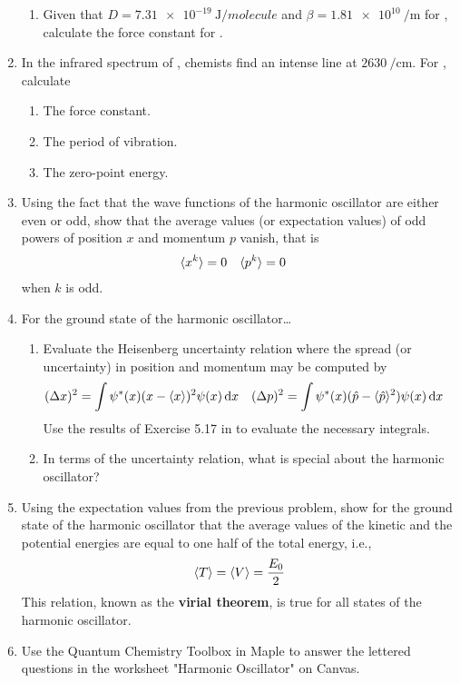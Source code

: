 \documentclass[../psets.tex]{subfiles}
\begin{document}
\begin{enumerate}
\begin{enumerate}
        \item Given that $D=\SI{7.31e-19}{\joule\per molecule}$ and $\beta=\SI{1.81e10}{\per\meter}$ for , calculate the force constant for .
    \end{enumerate}
    \item In the infrared spectrum of , chemists find an intense line at $\SI{2630}{\per\centi\meter}$. For , calculate
    \begin{enumerate}
        \item The force constant.
        \item The period of vibration.
        \item The zero-point energy.
    \end{enumerate}
    \item Using the fact that the wave functions of the harmonic oscillator are either even or odd, show that the average values (or expectation values) of odd powers of position $x$ and momentum $p$ vanish, that is
    \begin{align*}
        \langle{x^k}\rangle &= 0&
        \langle{p^k}\rangle &= 0
    \end{align*}
    when $k$ is odd.
    \item For the ground state of the harmonic oscillator\dots
    \begin{enumerate}
        \item Evaluate the Heisenberg uncertainty relation where the spread (or uncertainty) in position and momentum may be computed by
        \begin{align*}
            (\Delta x)^2 &= \int\psi^*(x)(x-\langle{x}\rangle)^2\psi(x)\dd{x}&
            (\Delta p)^2 &= \int\psi^*(x)(\hat{p}-\langle{\hat{p}}\rangle^2)\psi(x)\dd{x}
        \end{align*}
        Use the results of Exercise 5.17 in \textcite{bib:McQuarrieSimon} to evaluate the necessary integrals.
        \item In terms of the uncertainty relation, what is special about the harmonic oscillator?
    \end{enumerate}
    \item Using the expectation values from the previous problem, show for the ground state of the harmonic oscillator that the average values of the kinetic and the potential energies are equal to one half of the total energy, i.e.,
    \begin{equation*}
        \langle{T}\rangle = \langle{V}\rangle = \frac{E_0}{2}
    \end{equation*}
    This relation, known as the \textbf{virial theorem}, is true for all states of the harmonic oscillator.
    \item Use the Quantum Chemistry Toolbox in Maple to answer the lettered questions in the worksheet "Harmonic Oscillator" on Canvas.
\end{enumerate}
\end{document}
